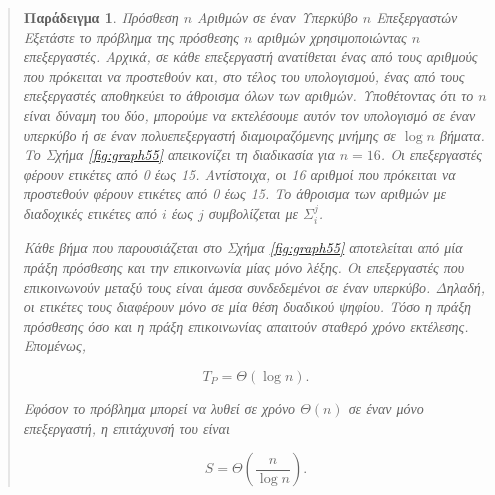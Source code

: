 \documentclass[12pt,a4paper]{article} %
\newtheorem{paradeigma}{Παράδειγμα}
\begin{document}
\begin{quote}
\begin{paradeigma} \label{par:4} Πρόσθεση $n$ Αριθμών σε έναν Υπερκύβο $n$ Επεξεργαστών
Εξετάστε το πρόβλημα της πρόσθεσης $n$ αριθμών χρησιμοποιώντας $n$
επεξεργαστές. Αρχικά, σε κάθε επεξεργαστή ανατίθεται ένας από τους
αριθμούς που πρόκειται να προστεθούν και, στο τέλος του υπολογισμού,
ένας από τους επεξεργαστές αποθηκεύει το άθροισμα όλων των αριθμών.
Υποθέτοντας ότι το $n$ είναι δύναμη του δύο, μπορούμε να εκτελέσουμε
αυτόν τον υπολογισμό σε έναν υπερκύβο ή σε έναν πολυεπεξεργαστή 
διαμοιραζόμενης μνήμης σε $\log n$ βήματα. Το Σχήμα \ref{fig:graph55} 
απεικονίζει τη διαδικασία για $n = 16$. Οι επεξεργαστές φέρουν ετικέτες 
από 0 έως 15. Αντίστοιχα, οι 16 αριθμοί που πρόκειται να προστεθούν φέρουν
ετικέτες από 0 έως 15. Το άθροισμα των αριθμών με διαδοχικές ετικέτες από 
$i$ έως $j$ συμβολίζεται με $\Sigma_i^j$.

Κάθε βήμα που παρουσιάζεται στο Σχήμα \ref{fig:graph55} αποτελείται από 
μία πράξη πρόσθεσης και την επικοινωνία μίας μόνο λέξης. Οι επεξεργαστές 
που επικοινωνούν μεταξύ τους είναι άμεσα συνδεδεμένοι σε έναν υπερκύβο.
Δηλαδή, οι ετικέτες τους διαφέρουν μόνο σε μία θέση δυαδικού ψηφίου.
Τόσο η πράξη πρόσθεσης όσο και η πράξη επικοινωνίας απαιτούν σταθερό
χρόνο εκτέλεσης. Επομένως,

\begin{equation}
T_P = \Theta(\log n).
\label{eq:relation19}
\end{equation}

\noindent Εφόσον το πρόβλημα μπορεί να λυθεί σε χρόνο $\Theta(n)$ σε έναν 
μόνο επεξεργαστή, η επιτάχυνσή του είναι

\begin{equation}
S = \Theta\!\left(\frac{n}{\log n}\right).
\label{eq:relation20}
\end{equation}

\end{paradeigma}
\end{quote}
\end{document}

